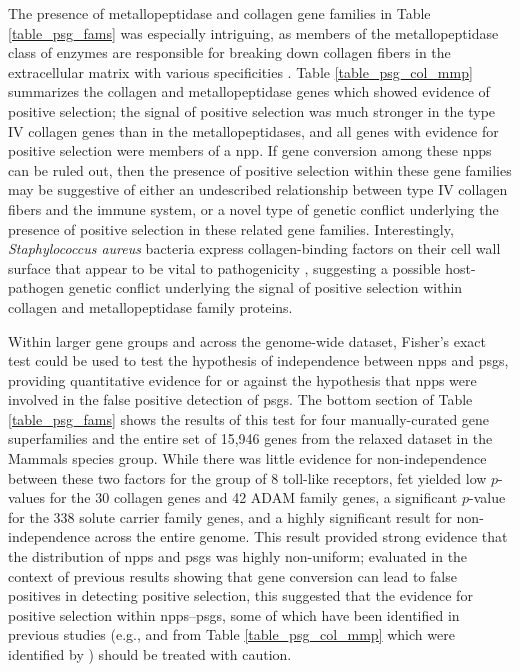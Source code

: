 The presence of metallopeptidase and collagen gene families in Table
\ref{table_psg_fams} was especially intriguing, as members of the
metallopeptidase class of enzymes are responsible for breaking down
collagen fibers in the extracellular matrix with various specificities
\citep{Sluijter2006}. Table \ref{table_psg_col_mmp} summarizes the
collagen and metallopeptidase genes which showed evidence of positive
selection; the signal of positive selection was much stronger in the
type IV collagen genes than in the metallopeptidases, and all genes
with evidence for positive selection were members of a \ac{npp}. If
gene conversion among these \acp{npp} can be ruled out, then the
presence of positive selection within these gene families may be
suggestive of either an undescribed relationship between type IV
collagen fibers and the immune system, or a novel type of genetic
conflict underlying the presence of positive selection in these
related gene families. Interestingly, \emph{Staphylococcus aureus}
bacteria express collagen-binding factors on their cell wall surface
that appear to be vital to pathogenicity
\citep{Foster1998,Ohbayashi2011}, suggesting a possible host-pathogen
genetic conflict underlying the signal of positive selection within
collagen and metallopeptidase family proteins.

Within larger gene groups and across the genome-wide dataset, Fisher's
exact test could be used to test the hypothesis of independence
between \acp{npp} and \acp{psg}, providing quantitative evidence for
or against the hypothesis that \acp{npp} were involved in the false
positive detection of \acp{psg}. The bottom section of Table
\ref{table_psg_fams} shows the results of this test for four
manually-curated gene superfamilies and the entire set of 15,946 genes
from the relaxed dataset in the Mammals species group. While there was
little evidence for non-independence between these two factors for the
group of 8 toll-like receptors, \ac{fet} yielded low $p$-values for
the 30 collagen genes and 42 ADAM family genes, a significant
$p$-value for the 338 solute carrier family genes, and a highly
significant result for non-independence across the entire genome. This
result provided strong evidence that the distribution of \acp{npp} and
\acp{psg} was highly non-uniform; evaluated in the context of previous
results showing that gene conversion can lead to false positives in
detecting positive selection, this suggested that the evidence for
positive selection within \acp{npp}--\acp{psg}, some of which have
been identified in previous studies (e.g.,  and
 from Table \ref{table_psg_col_mmp} which were identified
by \citet{Kosiol2008}) should be treated with caution.

